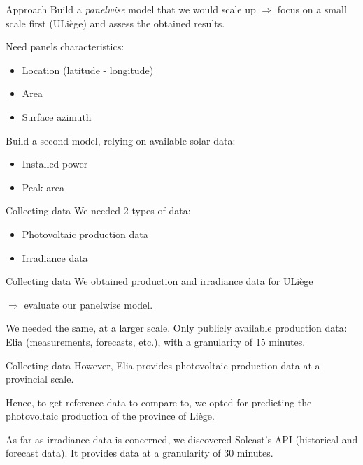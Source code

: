 \documentclass[12pt]{beamer}
\begin{document}
\begin{frame}{Approach}
    Build a \emph{panelwise} model that we would scale up $\Rightarrow$ focus on a \alert{small} scale first (ULiège) and assess the obtained results.
    
    Need panels characteristics:
    \begin{itemize}
        \item Location (latitude - longitude)
        \item Area
        \item Surface azimuth
    \end{itemize}
    
    Build a second model, relying on available solar data:
    \begin{itemize}
        \item Installed power
        \item Peak area
    \end{itemize}
\end{frame}

\begin{frame}{Collecting data}
    We needed 2 types of data:
    \begin{itemize}
        \item Photovoltaic \alert{production} data
        \item \alert{Irradiance} data
    \end{itemize}
\end{frame}

\begin{frame}{Collecting data}
    We obtained production and irradiance data for ULiège 
    
    $\Rightarrow$ \alert{evaluate} our panelwise model.
    
    We needed the same, at a \alert{larger scale}. Only \alert{publicly available} production data: Elia (measurements, forecasts, etc.), with a granularity of 15 minutes.
\end{frame}

\begin{frame}{Collecting data}
    However, Elia provides photovoltaic production data at a \alert{provincial} scale.
    
    Hence, to get reference data to \alert{compare} to, we opted for predicting the photovoltaic production of the province of Liège. 

    As far as irradiance data is concerned, we discovered \alert{Solcast}'s API (historical and forecast data). It provides data at a granularity of 30 minutes.
\end{frame}
\end{document}
